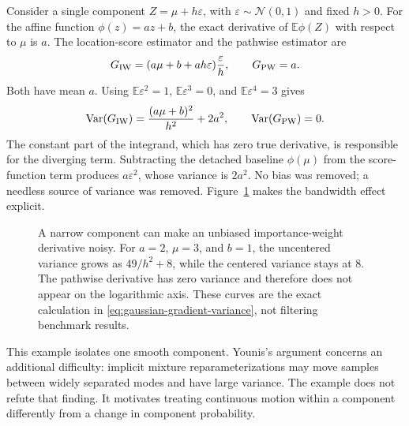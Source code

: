 \documentclass[11pt]{article}
\begin{document}
Consider a single component $Z=\mu+h\varepsilon$, with
$\varepsilon\sim\mathcal N(0,1)$ and fixed $h>0$. For the affine function
$\phi(z)=az+b$, the exact derivative of $\mathbb E\phi(Z)$ with respect to
$\mu$ is $a$. The location-score estimator and the pathwise estimator are
\begin{equation}
 G_{\rm IW}=(a\mu+b+ah\varepsilon)\frac{\varepsilon}{h},
 \qquad G_{\rm PW}=a.
 \label{eq:gaussian-gradient-estimators}
\end{equation}
Both have mean $a$. Using
$\mathbb E\varepsilon^2=1$, $\mathbb E\varepsilon^3=0$, and
$\mathbb E\varepsilon^4=3$ gives
\begin{equation}
 \operatorname{Var}(G_{\rm IW})
   =\frac{(a\mu+b)^2}{h^2}+2a^2,
 \qquad \operatorname{Var}(G_{\rm PW})=0.
 \label{eq:gaussian-gradient-variance}
\end{equation}
The constant part of the integrand, which has zero true derivative, is
responsible for the diverging term. Subtracting the detached baseline
$\phi(\mu)$ from the score-function term produces $a\varepsilon^2$, whose
variance is $2a^2$. No bias was removed; a needless source of variance was
removed. Figure~\ref{fig:gradient-variance} makes the bandwidth effect explicit.

\begin{figure}[tbp]
\centering
{}
\caption{A narrow component can make an unbiased importance-weight derivative
noisy. For $a=2$, $\mu=3$, and $b=1$, the uncentered variance grows as
$49/h^2+8$, while the centered variance stays at 8. The pathwise derivative
has zero variance and therefore does not appear on the logarithmic axis.
These curves are the exact calculation in
\eqref{eq:gaussian-gradient-variance}, not filtering benchmark results.}
\label{fig:gradient-variance}
\end{figure}

This example isolates one smooth component. Younis's argument concerns an
additional difficulty: implicit mixture reparameterizations may move samples
between widely separated modes and have large variance. The example does
not refute that finding. It motivates treating continuous motion within a
component differently from a change in component probability.
\end{document}

